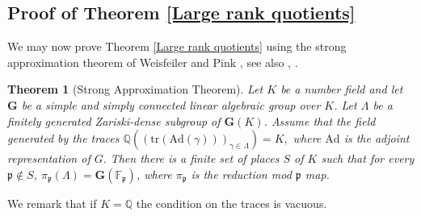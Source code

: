 \documentclass[letterpaper]{amsart}
\newtheorem{theorem}{Theorem}[section]
\begin{document}
\subsection{Proof of Theorem \ref{Large rank quotients}}
We may now prove Theorem \ref{Large rank quotients} using the strong approximation theorem of Weisfeiler \cite{weisfeiler1984strong} and Pink \cite{pink2000strong}, see also \cite[Window 9, Corollary 3]{lubotzky2012subgroup}, \cite[Theorem 3.2]{chen2025finite}.
\begin{theorem}[Strong Approximation Theorem]
    Let $K$ be a number field and let $\textbf{G}$ be a simple and simply connected linear algebraic group over $K$. Let $\Lambda$ be a finitely generated Zariski-dense subgroup of $\textbf{G}(K)$. Assume that the field generated by the traces $\mathbb{Q}((\mathrm{tr}(\mathrm{Ad}(\gamma)))_{\gamma\in\Lambda}) = K,$ where $\mathrm{Ad}$ is the adjoint representation of $G.$ Then there is a finite set of places $S$ of $K$ such that for every $\mathfrak{p} \notin S$, $\pi_\mathfrak{p}(\Lambda) = \textbf{G}(\mathbb{F}_\mathfrak{p})$, where $\pi_\mathfrak{p}$ is the reduction mod $\mathfrak{p}$ map.
\end{theorem}
We remark that if $K = \mathbb{Q}$ the condition on the traces is vacuous.
\end{document}
